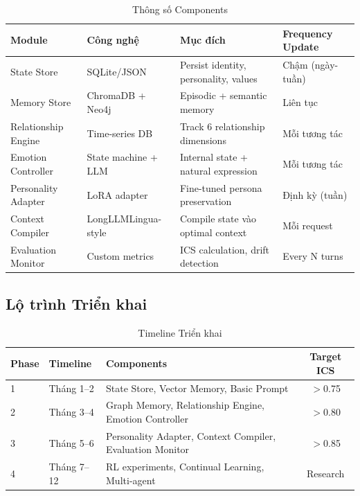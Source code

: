 \begin{table}[H]
\centering
\caption{Thông số Components}
\label{tab:components}
\begin{tabular}{llll}
\toprule
\textbf{Module} & \textbf{Công nghệ} & \textbf{Mục đích} & \textbf{Frequency Update} \\
\midrule
State Store & SQLite/JSON & Persist identity, personality, values & Chậm (ngày-tuần) \\
Memory Store & ChromaDB + Neo4j & Episodic + semantic memory & Liên tục \\
Relationship Engine & Time-series DB & Track 6 relationship dimensions & Mỗi tương tác \\
Emotion Controller & State machine + LLM & Internal state + natural expression & Mỗi tương tác \\
Personality Adapter & LoRA adapter & Fine-tuned persona preservation & Định kỳ (tuần) \\
Context Compiler & LongLLMLingua-style & Compile state vào optimal context & Mỗi request \\
Evaluation Monitor & Custom metrics & ICS calculation, drift detection & Every N turns \\
\bottomrule
\end{tabular}
\end{table}

\subsection{Lộ trình Triển khai}

\begin{table}[H]
\centering
\caption{Timeline Triển khai}
\label{tab:roadmap}
\begin{tabular}{lllc}
\toprule
\textbf{Phase} & \textbf{Timeline} & \textbf{Components} & \textbf{Target ICS} \\
\midrule
1 & Tháng 1--2 & State Store, Vector Memory, Basic Prompt & $>$0.75 \\
2 & Tháng 3--4 & Graph Memory, Relationship Engine, Emotion Controller & $>$0.80 \\
3 & Tháng 5--6 & Personality Adapter, Context Compiler, Evaluation Monitor & $>$0.85 \\
4 & Tháng 7--12 & RL experiments, Continual Learning, Multi-agent & Research \\
\bottomrule
\end{tabular}
\end{table}

